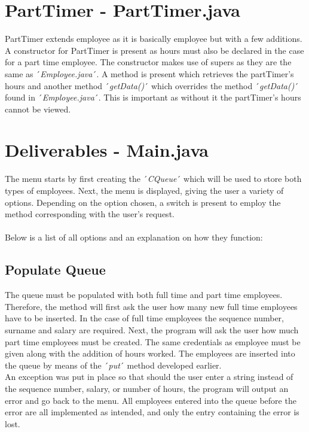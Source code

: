 \documentclass[12pt]{article}
\begin{document}
\section{PartTimer - PartTimer.java}
PartTimer extends employee as it is basically employee but with a few additions. A constructor for PartTimer is present as hours must also be declared in the case for a part time employee. The constructor makes use of supers as they are the same as ´\emph{Employee.java}´. A method is present which retrieves the partTimer's hours and another method ´\emph{getData()}´ which overrides the method ´\emph{getData()}´ found in ´\emph{Employee.java}´. This is important as without it the partTimer's hours cannot be viewed.
\bigskip

\newpage
\section{Deliverables - Main.java}
The menu starts by first creating the ´\emph{CQueue}´ which will be used to store both types of employees. Next, the menu is displayed, giving the user a variety of options. Depending on the option chosen, a switch is present to employ the method corresponding with the user's request.\\
\\Below is a list of all options and an explanation on how they function:

\subsection{Populate Queue}
The queue must be populated with both full time and part time employees. Therefore, the method will first ask the user how many new full time employees have to be inserted. In the case of full time employees the sequence number, surname and salary are required. Next, the program will ask the user how much part time employees must be created. The same credentials as employee must be given along with the addition of hours worked. The employees are inserted into the queue by means of the ´\emph{put}´ method developed earlier.
\bigskip
\\An exception was put in place so that should the user enter a string instead of the sequence number, salary, or number of hours, the program will output an error and go back to the menu. All employees entered into the queue before the error are all implemented as intended, and only the entry containing the error is lost.
\end{document}
